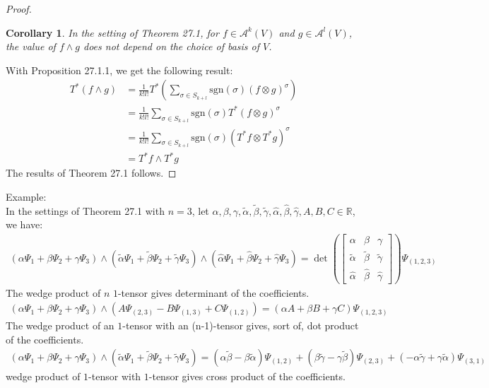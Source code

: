 \documentclass[11pt,oneside]{book}
\theoremstyle{break}
\theoremstyle{break}
\newtheorem{corT}[lem]{Corollary}
\newcommand{\R}{\mathbb{R}}
\newcommand{\A}{\mathcal{A}}
\newcommand{\that}[1]{\widetilde{#1}}
\newcommand{\lr}[1]{\left(#1\right)}
\newcommand{\bmat}[1]{\begin{bmatrix} #1 \end{bmatrix}}
\newcommand{\example}{\color{green}Example: \color{black}}
\begin{document}
\begin{proof}
\begin{corT}
\setlength{\leftskip}{1cm} In the setting of Theorem 27.1, for $f \in \A^{k}(V)$ and $g \in \A^l(V)$, the value of $f \wedge g$ does not depend on the choice of basis of $V$.
\end{corT}
With Proposition 27.1.1, we get the following result:
\begin{align*}
T^*(f \wedge g) &= \frac{1}{k!l!} T^*\left(\sum_{\sigma \in S_{k+l}} \text{sgn}(\sigma) (f\otimes g)^\sigma\right)\\
&= \frac{1}{k!l!}\sum_{\sigma \in S_{k+l}} \text{sgn}(\sigma)T^*(f\otimes g)^\sigma\\
&= \frac{1}{k!l!}\sum_{\sigma \in S_{k+l}} \text{sgn}(\sigma)(T^*f \otimes T^* g)^\sigma\\
&= T^*f \wedge T^*g
\end{align*}
The results of Theorem 27.1 follows. 
\end{proof}

\hfill\break
\hfill\break
\hfill\break
\example\\
In the settings of Theorem 27.1 with $n=3$, let $\alpha, \beta, \gamma , \that{\alpha},\that{\beta},\that{\gamma}, \hat{\alpha},\hat{\beta},\hat{\gamma},A,B,C \in \R$, we have:
\begin{align*}
(\alpha \Psi_1 + \beta \Psi_2 + \gamma \Psi_3) \wedge ( \that{\alpha} \Psi_1 + \that{\beta} \Psi_2 + \that{\gamma} \Psi_3) \wedge(\hat{\alpha}\Psi_1 + \hat{\beta}\Psi_2 + \hat{\gamma}\Psi_3)  = \det\lr{\bmat{\alpha & \beta & \gamma \\ \that{\alpha}& \that{\beta}& \that{\gamma} \\ \hat{\alpha}& \hat{\beta}&\hat{\gamma}}} \Psi_{(1,2,3)}
\end{align*}
The wedge product of $n$ $1$-tensor gives determinant of the coefficients.
\begin{align*}
(\alpha \Psi_1 +\beta \Psi_2 + \gamma \Psi_3)\wedge (A\Psi_{(2,3)}-B\Psi_{(1,3)}+C\Psi_{(1,2)}) = (\alpha A + \beta B + \gamma C)\Psi_{(1,2,3)}
\end{align*}
The wedge product of an $1$-tensor with an (n-1)-tensor gives, sort of, dot product of the coefficients.
\begin{align*}
(\alpha \Psi_1 + \beta \Psi_2 +\gamma \Psi_3) \wedge (\that{\alpha} \Psi_1 + \that{\beta} \Psi_2 + \that{\gamma} \Psi_3) = (\alpha \that{\beta} - \beta \that{\alpha})\Psi_{(1,2)} + (\beta \that{\gamma} - \gamma \that{\beta}) \Psi_{(2,3)} + (-\alpha \that{\gamma} + \gamma \that{\alpha}) \Psi_{(3,1)}
\end{align*}
wedge product of $1$-tensor with $1$-tensor gives cross product of the coefficients. 
\end{document}
